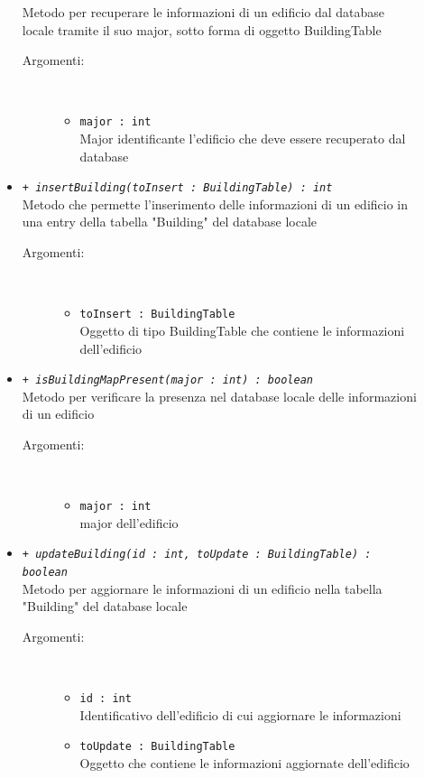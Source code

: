 \documentclass[../DefinizioneDiProdotto.tex]{subfiles}
\begin{document}
\begin{description}
\begin{itemize}
Metodo per recuperare le informazioni di un edificio dal database locale tramite il suo major, sotto forma di oggetto BuildingTable
 \begin{description}
\item[Argomenti:] \
\begin{itemize}
\item \texttt{major : int}\\
Major identificante l'edificio che deve essere recuperato dal database\end{itemize}
\end{description}
\item \texttt{+ \textit{insertBuilding(toInsert : BuildingTable) : int}}\\
Metodo che permette l'inserimento delle informazioni di un edificio in una entry della tabella "Building" del database locale
 \begin{description}
\item[Argomenti:] \
\begin{itemize}
\item \texttt{toInsert : BuildingTable}\\
Oggetto di tipo BuildingTable che contiene le informazioni dell'edificio\end{itemize}
\end{description}
\item \texttt{+ \textit{isBuildingMapPresent(major : int) : boolean}}\\
Metodo per verificare la presenza nel database locale delle informazioni di un edificio
 \begin{description}
\item[Argomenti:] \
\begin{itemize}
\item \texttt{major : int}\\
major dell'edificio\end{itemize}
\end{description}
\item \texttt{+ \textit{updateBuilding(id : int, toUpdate : BuildingTable) : boolean}}\\
Metodo per aggiornare le informazioni di un edificio nella tabella "Building" del database locale
 \begin{description}
\item[Argomenti:] \
\begin{itemize}
\item \texttt{id : int}\\
Identificativo dell'edificio di cui aggiornare le informazioni\item \texttt{toUpdate : BuildingTable}\\
Oggetto che contiene le informazioni aggiornate dell'edificio\end{itemize}
\end{description}
\end{itemize}
\end{description}
\end{document}
